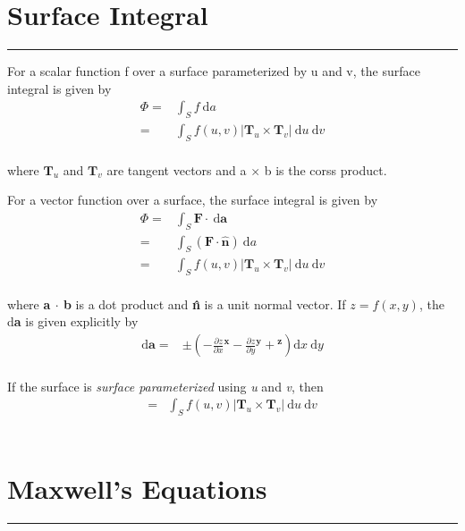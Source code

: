 \documentclass[letterpaper,10pt,fleqn]{article}
\numberwithin{equation}{section}
\newcommand{\D}{\mathrm{d}}
\begin{document}

\section*{Surface Integral}
\addtocounter{section}{1}
\hrule

For a scalar function f over a surface parameterized by u and v, the surface integral is given by
\\
\begin{eqnarray}
  \Phi =& \displaystyle\int_S f\ \D a \\
  =& \displaystyle\int_S f(u, v)|\mathbf{T}_u \times \mathbf{T}_v|\ \D u \ \D v
\end{eqnarray}
\\
where \(\mathbf{T}_u\) and \(\mathbf{T}_v\) are tangent vectors and a \(\times\) b is the corss product.

For a vector function over a surface, the surface integral is given by
\\
\begin{eqnarray}
  \Phi =& \displaystyle\int_S \mathbf{F} \cdot \ \D \mathbf{a} \\
  =& \displaystyle\int_S (\mathbf{F} \cdot \mathbf{\hat{n}}) \ \D a \\
  =& \displaystyle\int_S f(u, v)|\mathbf{T}_u \times \mathbf{T}_v|\ \D u \ \D v
\end{eqnarray}
\\
where \textbf{a \(\cdot\) b} is a dot product and \textbf{\^n} is a unit normal vector. If \(z = f(x, y)\), the d\textbf{a} is given explicitly by
\\
\begin{eqnarray}
  \D \mathbf{a} =& \pm \displaystyle(-\frac{\partial z}{\partial x}\mathbf{^x} - \frac{\partial z}{\partial y}\mathbf{^y} + \mathbf{^z}) \D x \ \D y
\end{eqnarray}
\\
If the surface is \emph{surface parameterized} using \emph{u} and \emph{v}, then
\\
\begin{eqnarray}
  =& \displaystyle\int_S f(u, v)|\mathbf{T}_u \times \mathbf{T}_v|\ \D u \ \D v
\end{eqnarray}
\\

\newpage

\section*{Maxwell's Equations}
\addtocounter{section}{1}
\hrule
\end{document}
